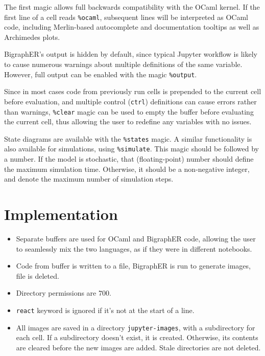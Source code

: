 \documentclass{article}
\begin{document}
The first magic allows full backwards compatibility with the OCaml kernel. If
the first line of a cell reads \texttt{\%ocaml}, subsequent lines will be
interpreted as OCaml code, including Merlin-based autocomplete and documentation
tooltips as well as Archimedes plots.

BigraphER's output is hidden by default, since typical Jupyter workflow is
likely to cause numerous warnings about multiple definitions of the same
variable. However, full output can be enabled with the magic \texttt{\%output}.

Since in most cases code from previously run cells is prepended to the current
cell before evaluation, and multiple control (\texttt{ctrl}) definitions can
cause errors rather than warnings, \texttt{\%clear} magic can be used to empty
the buffer before evaluating the current cell, thus allowing the user to
redefine any variables with no issues.

State diagrams are available with the \texttt{\%states} magic. A similar
functionality is also available for simulations, using \texttt{\%simulate}. This
magic should be followed by a number. If the model is stochastic, that
(floating-point) number should define the maximum simulation time. Otherwise, it
should be a non-negative integer, and denote the maximum number of simulation
steps.

\section{Implementation}

\begin{itemize}
\item Separate buffers are used for OCaml and BigraphER code, allowing the user
  to seamlessly mix the two languages, as if they were in different notebooks.
\item Code from buffer is written to a file, BigraphER is run to generate
  images, file is deleted.
\item Directory permissions are $700$.
\item \texttt{react} keyword is ignored if it's not at the start of a line.
\item All images are saved in a directory \texttt{jupyter-images}, with a
  subdirectory for each cell. If a subdirectory doesn't exist, it is created.
  Otherwise, its contents are cleared before the new images are added. Stale
  directories are not deleted.
\end{itemize}
\end{document}
